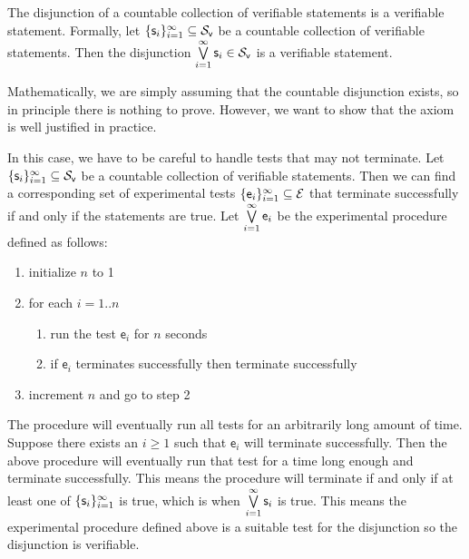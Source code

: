 \documentclass[11pt,letterpaper,fleqn]{memoir} %
\begin{document}
\begin{mathSection}
	\begin{axiom}\label{ax_verifiable_OR}
	The disjunction of a countable collection of verifiable statements is a verifiable statement. Formally, let $\{\mathsf{s}_i\}_{i=1}^{\infty} \subseteq \mathcal{S}_\textsf{v}$ be a countable collection of verifiable statements. Then the disjunction $\bigvee\limits_{i=1}^{\infty} \mathsf{s}_i \in \mathcal{S}_\textsf{v}$ is a verifiable statement.
	\end{axiom}
	\begin{justification}
		Mathematically, we are simply assuming that the countable disjunction exists, so in principle there is nothing to prove. However, we want to show that the axiom is well justified in practice.
		
		In this case, we have to be careful to handle tests that may not terminate. Let $\{\mathsf{s}_i\}_{i=1}^{\infty} \subseteq \mathcal{S}_\textsf{v}$ be a countable collection of verifiable statements. Then we can find a corresponding set of experimental tests $\{\mathsf{e}_i\}_{i=1}^{\infty} \subseteq \mathcal{E}$ that terminate successfully if and only if the statements are true.
		Let $\bigvee\limits_{i=1}^{\infty} \mathsf{e}_i$ be the experimental procedure defined as follows:
		\begin{enumerate}
			\item initialize $n$ to 1
			\item for each $i=1..n$
			\begin{enumerate}
				\item run the test $\mathsf{e}_i$ for $n$ seconds
				\item if $\mathsf{e}_i$ terminates successfully then terminate successfully
			\end{enumerate}
			\item increment $n$ and go to step 2
		\end{enumerate}
		The procedure will eventually run all tests for an arbitrarily long amount of time. Suppose there exists an $i \geq 1$ such that $\mathsf{e}_i$ will terminate successfully. Then the above procedure will eventually run that test for a time long enough and terminate successfully. This means the procedure will terminate if and only if at least one of $\{\mathsf{s}_i\}_{i=1}^{\infty}$ is true, which is when $\bigvee\limits_{i=1}^{\infty} \mathsf{s}_i$ is true. This means the experimental procedure defined above is a suitable test for the disjunction so the disjunction is verifiable. 


\end{justification}
\end{mathSection}
\end{document}
